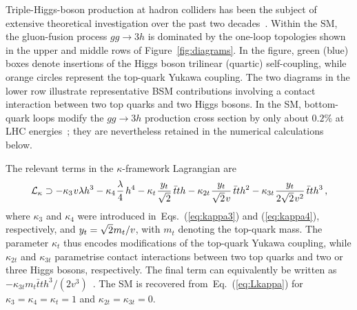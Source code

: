 \documentclass{SciPost}
\def\beq{\begin{equation}}
\def\eeq{\end{equation}}
\begin{document}
Triple-Higgs-boson production at hadron colliders has been the subject of extensive theoretical investigation over the past two decades~\cite{Plehn:2005nk,Binoth:2006ym,Maltoni:2014eza,Papaefstathiou:2015paa,Chen:2015gva,Fuks:2015hna,deFlorian:2016sit,Kilian:2017nio,Fuks:2017zkg,Bizon:2018syu,deFlorian:2019app,Stylianou:2023xit,Papaefstathiou:2023uum,Abouabid:2024gms,Dong:2025lkm,Haisch:2025pql,Campbell:2025llb,Fuks:2025gjv,Panizzi:2025sya,Ding:2026qto}. Within the SM, the gluon-fusion process $gg \to 3h$ is dominated by the one-loop topologies shown in the upper and middle rows of Figure~\ref{fig:diagrams}. In the figure, green (blue) boxes denote insertions of the Higgs boson trilinear (quartic) self-coupling, while orange circles represent the top-quark Yukawa coupling. The two diagrams in the lower row illustrate representative BSM contributions involving a contact interaction between two top quarks and two Higgs bosons. In the SM, bottom-quark loops modify the $gg \to 3h$ production cross section by only about $0.2\%$ at LHC energies~\cite{Campbell:2025llb}; they are nevertheless retained in the numerical calculations below.

The relevant terms in the $\kappa$-framework Lagrangian are
\beq \label{eq:Lkappa}
{\cal L}_{\kappa} \supset -\kappa_3 \hspace{0.25mm} v \lambda h^3 -\kappa_4 \hspace{0.25mm} \frac{\lambda}{4} \hspace{0.5mm} h^4 -\kappa_t \hspace{0.25mm} \frac{y_t}{\sqrt{2}} \hspace{0.5mm} \bar t t h  -\kappa_{2t} \hspace{0.25mm} \frac{y_t}{\sqrt{2} \hspace{0.25mm} v} \hspace{0.5mm} \bar t t h^2 -\kappa_{3t} \hspace{0.25mm} \frac{y_t}{2\sqrt{2} \hspace{0.25mm} v^2} \hspace{0.5mm} \bar t t h^3 \,,
\eeq
where $\kappa_3$ and $\kappa_4$ were introduced in~Eqs.~(\ref{eq:kappa3}) and (\ref{eq:kappa4}), respectively, and $y_t = \sqrt{2} \hspace{0.125mm} m_t/v$, with $m_t$ denoting the top-quark mass. The parameter $\kappa_t$ thus encodes modifications of the top-quark Yukawa coupling, while $\kappa_{2t}$ and $\kappa_{3t}$ parametrise contact interactions between two top quarks and two or three Higgs bosons, respectively. The final term can equivalently be written as $-\kappa_{3t}m_t\bar t t h^3/(2v^3)$~\cite{Papaefstathiou:2023uum}. The SM is recovered from~Eq.~(\ref{eq:Lkappa}) for $\kappa_3 = \kappa_4 = \kappa_t = 1$ and $\kappa_{2t} = \kappa_{3t} = 0$.
\end{document}
